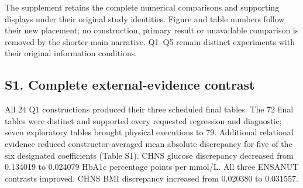 \documentclass[11pt,letterpaper]{article}
\begin{document}
\renewcommand{\thefigure}{S\arabic{figure}}

\setcounter{table}{0}

\renewcommand{\thetable}{S\arabic{table}}

The supplement retains the complete numerical comparisons and supporting displays under their original study identities. Figure and table numbers follow their new placement; no construction, primary result or unavailable comparison is removed by the shorter main narrative. Q1–\allowbreak{}Q5 remain distinct experiments with their original information conditions.


\subsection*{S1. Complete external-evidence contrast}

All 24 Q1 constructions produced their three scheduled final tables. The 72 final tables were distinct and supported every requested regression and diagnostic; seven exploratory tables brought physical executions to 79. Additional relational evidence reduced constructor-averaged mean absolute discrepancy for five of the six designated coefficients (Table S1). CHNS glucose discrepancy decreased from 0.134019 to 0.024079 HbA1c percentage points per mmol/\allowbreak{}L. All three ENSANUT contrasts improved. CHNS BMI discrepancy increased from 0.020380 to 0.031557.


\FloatBarrier

\begingroup

\small

\renewcommand{\arraystretch}{1.22}
\end{document}
